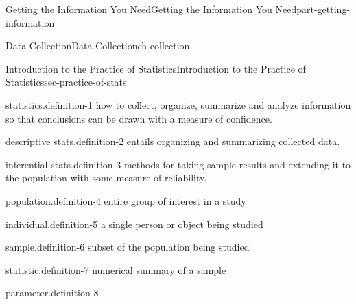 \documentclass[oneside,10pt,]{book}
\numberwithin{equation}{section}
\begin{document}
\setcounter{tocdepth}{0}
\renewcommand*\contentsname{Contents}
\tableofcontents
\mainmatter
%
%
\typeout{************************************************}
\typeout{************************************************}
%
\begin{partptx}{Getting the Information You Need}{}{Getting the Information You Need}{}{}{part-getting-information}
%
\typeout{************************************************}
\typeout{************************************************}
%
\begin{chapterptx}{Data Collection}{}{Data Collection}{}{}{ch-collection}
%
%
\typeout{************************************************}
\typeout{************************************************}
%
\begin{sectionptx}{Introduction to the Practice of Statistics}{}{Introduction to the Practice of Statistics}{}{}{sec-practice-of-stats}
\begin{definition}{statistics.}{definition-1}%
how to collect, organize, summarize and analyze information so that conclusions can be drawn with a measure of confidence.\end{definition}
\begin{definition}{descriptive stats.}{definition-2}%
entails organizing and summarizing collected data.\end{definition}
\begin{definition}{inferential stats.}{definition-3}%
methods for taking sample results and extending it to the population with some measure of reliability.\end{definition}
\begin{definition}{population.}{definition-4}%
entire group of interest in a study\end{definition}
\begin{definition}{individual.}{definition-5}%
a single person or object being studied\end{definition}
\begin{definition}{sample.}{definition-6}%
subset of the population being studied\end{definition}
\begin{definition}{statistic.}{definition-7}%
numerical summary of a sample\end{definition}
\begin{definition}{parameter.}{definition-8}%

\end{definition}
\end{sectionptx}
\end{chapterptx}
\end{partptx}
\end{document}
